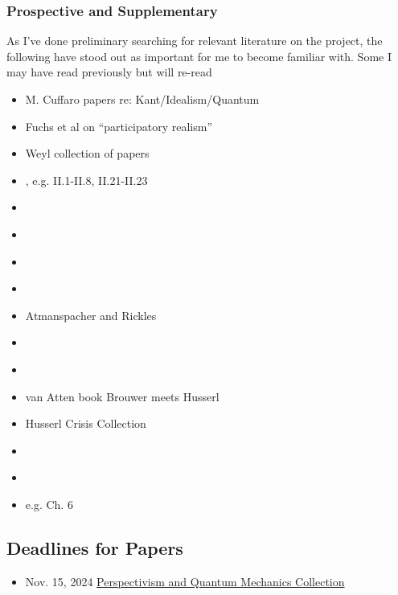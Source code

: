 \subsubsection{Prospective and Supplementary}

As I've done preliminary searching for relevant literature on the project, the following have stood out as important for me to become familiar with. Some I may have read previously but will re-read

\begin{itemize}
    \item M. Cuffaro papers re: Kant/Idealism/Quantum
    \item Fuchs et al on ``participatory realism''
    \item Weyl collection of papers
    \item \cite{SchilppCassirer}, e.g. II.1-II.8, II.21-II.23
    \item \cite{Adorno1940}
    \item \cite{Clifford1878}
    \item \cite{Ewing1934}
    \item \cite{Kilmister1994}
    \item Atmanspacher and Rickles
    \item \cite{Cartwright1983}
    \item \cite{Torretti1999}
    \item van Atten book Brouwer meets Husserl
    \item Husserl Crisis Collection
    \item \cite{Zahar2001}
    \item \cite{Zahar2007}
    \item \cite{Kelsen1946} e.g. Ch. 6



\end{itemize}




\subsection{Deadlines for Papers}

\begin{itemize}
    \item Nov. 15, 2024 \href{https://link.springer.com/collections/cabhjbifbf}{Perspectivism and Quantum Mechanics Collection}
\end{itemize}










